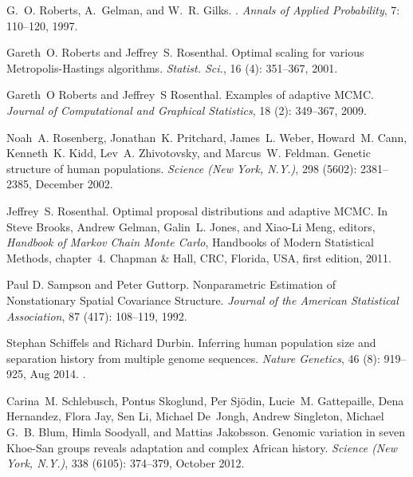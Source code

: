 \documentclass[10pt,letterpaper]{article}
\begin{document}
\begin{thebibliography}{80}
G.~O. Roberts, A.~Gelman, and W.~R. Gilks.
.
\newblock \emph{Annals of Applied Probability}, 7: 110--120, 1997.

Gareth~O. Roberts and Jeffrey~S. Rosenthal.
\newblock Optimal scaling for various {M}etropolis-{H}astings algorithms.
\newblock \emph{Statist. Sci.}, 16 (4): 351--367, 2001.

Gareth~O Roberts and Jeffrey~S Rosenthal.
\newblock Examples of adaptive {MCMC}.
\newblock \emph{Journal of Computational and Graphical Statistics}, 18
  (2): 349--367, 2009.

Noah~A. Rosenberg, Jonathan~K. Pritchard, James~L. Weber, Howard~M. Cann,
  Kenneth~K. Kidd, Lev~A. Zhivotovsky, and Marcus~W. Feldman.
\newblock Genetic structure of human populations.
\newblock \emph{Science (New York, N.Y.)}, 298 (5602):
  2381--2385, December 2002.

Jeffrey~S. Rosenthal.
\newblock Optimal proposal distributions and adaptive {MCMC}.
\newblock In Steve Brooks, Andrew Gelman, Galin~L. Jones, and Xiao-Li Meng,
  editors, \emph{Handbook of {Markov} Chain {Monte} {Carlo}}, Handbooks of
  Modern Statistical Methods, chapter~4. Chapman \& Hall, CRC, Florida, USA,
  first edition, 2011.

Paul D.  Sampson  and  Peter  Guttorp.
\newblock Nonparametric Estimation of Nonstationary Spatial Covariance Structure.
\newblock \emph{Journal of the American Statistical Association}, 
87 (417): 108--119, 1992.

Stephan Schiffels  and Richard Durbin.
\newblock Inferring human population size and separation history from multiple genome sequences.
\newblock \emph{Nature Genetics}, 46 (8): 919--925, Aug 2014.
\newblock {}.

Carina~M. Schlebusch, Pontus Skoglund, Per Sjödin, Lucie~M. Gattepaille, Dena
  Hernandez, Flora Jay, Sen Li, Michael De~Jongh, Andrew Singleton, Michael
  G.~B. Blum, Himla Soodyall, and Mattias Jakobsson.
\newblock Genomic variation in seven {Khoe}-{San} groups reveals adaptation and
  complex {African} history.
\newblock \emph{Science (New York, N.Y.)}, 338 (6105):
  374--379, October 2012.


\end{thebibliography}
\end{document}
